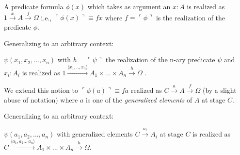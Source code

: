 \begin{definition}
	A predicate formula $\phi(x)$ which takes as argument an $x:A$ is realized as $1 \xrightarrow{x} A \xrightarrow{f} \Omega$ i.e., $\ulcorner \phi(x) \urcorner \equiv fx$ where $f = \ulcorner \phi \urcorner$ is the realization of the predicate $\phi$.
\end{definition}

Generalizing to an arbitrary context:

\begin{definition}
	$\psi(x_1,x_2,...,x_n)$ with  $h = \ulcorner \psi \urcorner$ the realization of the n-ary predicate $\psi$ and $x_i : A_i$  is realized as \newline
	$1 \xrightarrow{\langle x_1,..,x_n \rangle} A_1 \times ... \times A_n \xrightarrow{h} \Omega$ .
\end{definition}

\begin{definition}
	We extend this notion to $\ulcorner \phi(a) \urcorner \equiv f a$ realized as $C \xrightarrow{a} A \xrightarrow{f} \Omega$ (by a slight abuse of notation) where $a$ is one of the \emph{generalized elements} of $A$ at stage $C$.	
\end{definition}

Generalizing to an arbitrary context:

\begin{definition}
	 $\psi(a_1,a_2,...,a_n)$ with generalized elements $C \xrightarrow{a_i} A_i$ at stage $C$ is realized as
	 $C \xrightarrow{\langle a_1,a_2..,a_n \rangle} A_1 \times ... \times A_n \xrightarrow{h} \Omega$.
\end{definition}


